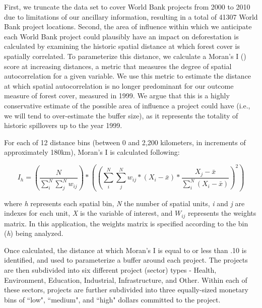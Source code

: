 \documentclass{article}\usepackage[]{graphicx}\usepackage[]{color}
\newenvironment{knitrout}{}{}  %
\begin{document}
\begin{knitrout}
First, we truncate the data set to cover World Bank projects from 2000 to 2010 due to limitations of our ancillary information, resulting in a total of 41307 World Bank project locations.
Second, the area of influence within which we anticipate each World Bank project could plausibly have an impact on deforestation is calculated by examining the historic spatial distance at which forest cover is spatially correlated. 
To parameterize this distance, we calculate a Moran's I (\cite{getis_analysis_1992}) score at increasing distances, a metric that measures the degree of spatial autocorrelation for a given variable.
We use this metric to estimate the distance at which spatial autocorrelation is no longer predominant for our outcome measure of forest cover, measured in 1999.  
We argue that this is a highly conservative estimate of the possible area of influence a project could have (i.e., we will tend to over-estimate the buffer size), as it represents the totality of historic spillovers up to the year 1999.

\par
For each of 12 distance bins (between 0 and 2,200 kilometers, in increments of approximately 180km), Moran's I is calculated following:

\begin{equation}
I_h = (\frac{N}{\sum_{i}^{N}\sum_{j}^{N}w_{ij}}) * ((\sum_{i}^{N}\sum_{j}^{N}w_{ij} * (X_{i}-\bar{x}) * \frac{X_{j} - \bar{x}}{\sum_{i}^{N}(X_{i}-\bar{x})})^{2})
\label{EQmoran}
\end{equation}

where \textit{h} represents each spatial bin, \textit{N} the number of spatial units, \textit{i} and \textit{j} are indexes for each unit, \textit{X} is the variable of interest, and \begin{math}W_{ij}\end{math} represents the weights matrix.  
In this application, the weights matrix is specified according to the bin (\textit{h}) being analyzed.  

\par
Once calculated, the distance at which Moran's I is equal to or less than .10 is identified, and used to parameterize a buffer around each project. 
The projects are then subdivided into six different project (sector) types - Health, Environment, Education, Industrial, Infrastructure, and Other.  
Within each of these sectors, projects are further subdivided into three equally-sized monetary bins of ``low", ``medium", and ``high" dollars committed to the project.


\end{knitrout}
\end{document}
